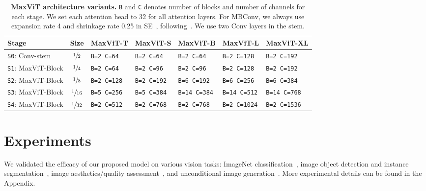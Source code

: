 \documentclass[runningheads]{llncs}
\begin{document}
\begin{table}[!t]
\centering
\footnotesize
\setlength{\tabcolsep}{1.2pt}
\renewcommand{\arraystretch}{1.0}
\caption{\normalsize \textbf{MaxViT architecture variants.} \texttt{B} and \texttt{C} denotes number of blocks and number of channels for each stage. We set each attention head to 32 for all attention layers. For MBConv, we always use expansion rate 4 and shrinkage rate 0.25 in SE~\cite{hu2018squeeze}, following~\cite{tan2019efficientnet,tan2021efficientnetv2,dai2021coatnet}. We use two Conv layers in the stem.}
\label{tab:model-variants}
\begin{tabular}{l|c|l|l|l|l|l}
{Stage} & {Size} & {MaxViT-T} & {MaxViT-S} & { MaxViT-B} & { MaxViT-L} & {MaxViT-XL} \\
\toprule
\texttt{S0}: Conv-stem & $\sfrac{1}{2}$ & \texttt{B=2  C=64} & \texttt{B=2 C=64} &  \texttt{B=2 \space  C=64} & \texttt{B=2 \space C=128}  & \texttt{B=2 \space C=192} \\
\texttt{S1}: MaxViT-Block & $\sfrac{1}{4}$ & \texttt{B=2  C=64} & \texttt{B=2 C=96} &  \texttt{B=2  \space  C=96} & \texttt{B=2 \space C=128}  & \texttt{B=2 \space C=192} \\
\texttt{S2}: MaxViT-Block & $\sfrac{1}{8}$ & \texttt{B=2  C=128} & \texttt{B=2 C=192} &  \texttt{B=6  \space  C=192} & \texttt{B=6 \space C=256}  & \texttt{B=6 \space C=384} \\
\texttt{S3}: MaxViT-Block & $\sfrac{1}{16}$ & \texttt{B=5  C=256} & \texttt{B=5 C=384} &  \texttt{B=14  C=384} & \texttt{B=14  C=512}  & \texttt{B=14  C=768} \\
\texttt{S4}: MaxViT-Block & $\sfrac{1}{32}$ & \texttt{B=2  C=512} & \texttt{B=2 C=768} &  \texttt{B=2  \space  C=768} & \texttt{B=2 \space C=1024}  & \texttt{B=2 \space C=1536} \\
\end{tabular}
\end{table}




\section{Experiments}

We validated the efficacy of our proposed model on various vision tasks: ImageNet classification~\cite{krizhevsky2012imagenet}, image object detection and instance segmentation~\cite{lin2014microsoft}, image aesthetics/quality assessment~\cite{murray2012ava}, and unconditional image generation~\cite{goodfellow2014generative}. More experimental details can be found in the Appendix.
\end{document}
